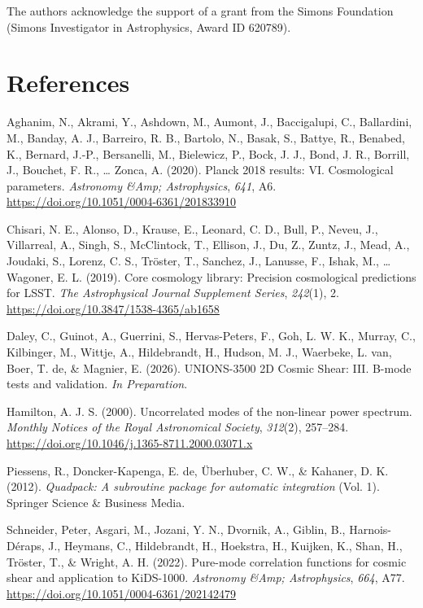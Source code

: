 \documentclass[
]{article}
\newlength{\cslhangindent}
\newenvironment{CSLReferences}[2] %
 {\begin{list}{}{%
  \setlength{\itemindent}{0pt}
  \setlength{\leftmargin}{0pt}
  \setlength{\parsep}{0pt}
  \ifodd #1
   \setlength{\leftmargin}{\cslhangindent}
   \setlength{\itemindent}{-1\cslhangindent}
  \fi
  \setlength{\itemsep}{#2\baselineskip}}}
 {\end{list}}
\begin{document}
The authors acknowledge the support of a grant from the Simons
Foundation (Simons Investigator in Astrophysics, Award ID 620789).

\section*{References}\label{references}

\protect{}\label{refs}
\begin{CSLReferences}{1}{0}
Aghanim, N., Akrami, Y., Ashdown, M., Aumont, J., Baccigalupi, C.,
Ballardini, M., Banday, A. J., Barreiro, R. B., Bartolo, N., Basak, S.,
Battye, R., Benabed, K., Bernard, J.-P., Bersanelli, M., Bielewicz, P.,
Bock, J. J., Bond, J. R., Borrill, J., Bouchet, F. R., \ldots{} Zonca,
A. (2020). Planck 2018 results: VI. Cosmological parameters.
\emph{Astronomy \&Amp; Astrophysics}, \emph{641}, A6.
\url{https://doi.org/10.1051/0004-6361/201833910}

Chisari, N. E., Alonso, D., Krause, E., Leonard, C. D., Bull, P., Neveu,
J., Villarreal, A., Singh, S., McClintock, T., Ellison, J., Du, Z.,
Zuntz, J., Mead, A., Joudaki, S., Lorenz, C. S., Tröster, T., Sanchez,
J., Lanusse, F., Ishak, M., \ldots{} Wagoner, E. L. (2019). Core
cosmology library: Precision cosmological predictions for LSST.
\emph{The Astrophysical Journal Supplement Series}, \emph{242}(1), 2.
\url{https://doi.org/10.3847/1538-4365/ab1658}

Daley, C., Guinot, A., Guerrini, S., Hervas-Peters, F., Goh, L. W. K.,
Murray, C., Kilbinger, M., Wittje, A., Hildebrandt, H., Hudson, M. J.,
Waerbeke, L. van, Boer, T. de, \& Magnier, E. (2026). {UNIONS-3500 2D
Cosmic Shear: III. B-mode tests and validation}. \emph{In Preparation}.

Hamilton, A. J. S. (2000). Uncorrelated modes of the non-linear power
spectrum. \emph{Monthly Notices of the Royal Astronomical Society},
\emph{312}(2), 257--284.
\url{https://doi.org/10.1046/j.1365-8711.2000.03071.x}

Piessens, R., Doncker-Kapenga, E. de, Überhuber, C. W., \& Kahaner, D.
K. (2012). \emph{Quadpack: A subroutine package for automatic
integration} (Vol. 1). Springer Science \& Business Media.

Schneider, Peter, Asgari, M., Jozani, Y. N., Dvornik, A., Giblin, B.,
Harnois-Déraps, J., Heymans, C., Hildebrandt, H., Hoekstra, H., Kuijken,
K., Shan, H., Tröster, T., \& Wright, A. H. (2022). Pure-mode
correlation functions for cosmic shear and application to KiDS-1000.
\emph{Astronomy \&Amp; Astrophysics}, \emph{664}, A77.
\url{https://doi.org/10.1051/0004-6361/202142479}


\end{CSLReferences}
\end{document}
